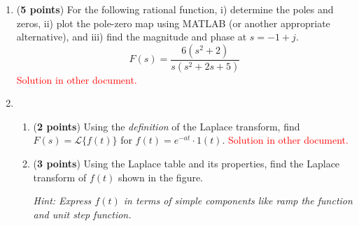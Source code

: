 \documentclass[]{article}
\begin{document}
\begin{enumerate}

    \item (\textbf{5 points}) For the following rational function, i) determine the poles and zeros, ii) plot the pole-zero map using MATLAB (or another appropriate alternative), and iii) find the magnitude and phase at $s=-1+j$.
    $$F(s)=\frac{6(s^2+2)}{s(s^2+2s+5)}$$
    \textcolor{red}{Solution in other document.}
    \vspace{0.2 cm}

    \item
    \begin{enumerate}
        \item (\textbf{2 points}) Using the \textit{definition} of the Laplace transform, find $F(s)=\mathcal{L}\{f(t)\}$ for $f(t)=e^{-at}\cdot1(t)$.
        \textcolor{red}{Solution in other document.}

        \item (\textbf{3 points}) Using the Laplace table and its properties, find the Laplace transform of $f(t)$ shown in the figure.
        \begin{center}
        \end{center}
        \textit{Hint: Express $f(t)$ in terms of simple components like ramp the function and unit step function.}


\end{enumerate}
\end{enumerate}
\end{document}

